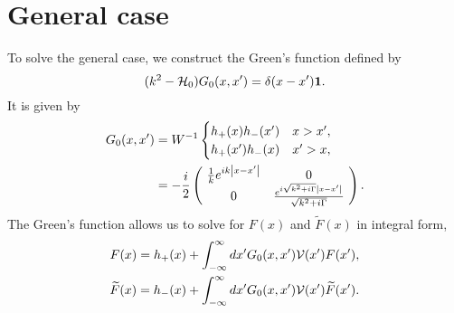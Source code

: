 \section{General case}
To solve the general case, we construct the Green's function defined by
%
\begin{equation}
	(k^2-{\cal H}_{0})G_{0}(x,x')=\delta(x-x')\mathbf{1}.
\end{equation}
%
It is given by
%
\begin{align}
	G_{0}(x,x')&=W^{-1} \begin{cases}
	h_{+}(x)h_{-}(x')  & x>x' , \\ h_{+}(x')h_{-}(x) & x'>x ,
	\end{cases}\nonumber \\
	&= -\frac{i}{2} \left(\!\begin{array}{cc}
	\frac{1}{k}e^{ i k \abs{x-x'}} & 0\\
	0 & \frac{e^{ i \sqrt{k^2+i \Gamma} \abs{x-x'}}}{\sqrt{k^2+i \Gamma}} \\
	\end{array}\!\right).
\end{align}
%
The Green's function allows us to solve for   $F(x)$ and $\widetilde{F}(x)$ in integral form,
%
\begin{eqnarray}
	F(x)=h_{+}(x)+\int_{-\infty}^{\infty} dx' G_{0}(x,x') {\cal V}(x') F(x'),
	\nonumber\\
	\widetilde{F}(x)=h_{-}(x)+\int_{-\infty}^{\infty} dx' G_{0}(x,x') {\cal V}(x') \widetilde{F}(x').
	\label{eqf}
\end{eqnarray}


